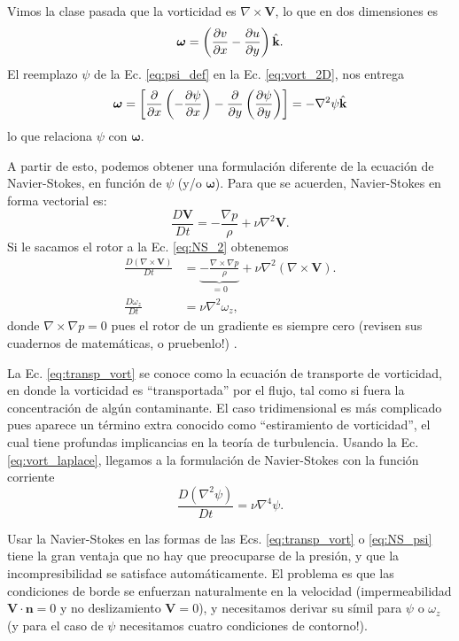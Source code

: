 Vimos la clase pasada que la vorticidad es $\nabla \times\mathbf{V}$, lo que en dos dimensiones es
%
\begin{equation}\label{eq:vort_2D}
\boldsymbol{\omega}=\left(\frac{\partial v}{\partial x}-\frac{\partial u}{\partial y} \right) \hat{\textbf{k}}.
\end{equation}
%
El reemplazo $\psi$ de la Ec. \eqref{eq:psi_def} en la Ec. \eqref{eq:vort_2D}, nos entrega
%
\begin{equation}\label{eq:vort_laplace}
\boldsymbol{\omega}=\left[\frac{\partial}{\partial x}\left(-\frac{\partial \psi}{\partial x}\right) -\frac{\partial}{\partial y}\left(\frac{\partial \psi}{\partial y}\right) \right] = -\nabla^2\psi\hat{\textbf{k}}
\end{equation}
%
lo que relaciona $\psi$ con $\boldsymbol{\omega}$.

A partir de esto, podemos obtener una formulación diferente de la ecuación de Navier-Stokes, en función de $\psi$ (y/o $\boldsymbol{\omega}$).
Para que se acuerden, Navier-Stokes en forma vectorial es:
%
\begin{equation}\label{eq:NS_2}
\frac{D\mathbf{V}}{Dt} = -\frac{\nabla p}{\rho} + \nu\nabla^2\mathbf{V}.
\end{equation}
%
Si le sacamos el rotor a la Ec. \eqref{eq:NS_2} obtenemos
%
\begin{align}\label{eq:transp_vort}
\frac{D(\nabla\times\mathbf{V})}{Dt} &= \underbrace{-\frac{\nabla\times\nabla p}{\rho}}_{=0} + \nu\nabla^2(\nabla\times\mathbf{V}). \nonumber\\
\frac{D \omega_z}{Dt} &= \nu \nabla^2 \omega_z,
\end{align}
%
donde $\nabla\times\nabla p=0$ pues el rotor de un gradiente es siempre cero (revisen sus cuadernos de matemáticas, o pruebenlo!) .

La Ec. \eqref{eq:transp_vort} se conoce como la ecuación de transporte de vorticidad, en donde la vorticidad es ``transportada'' por el flujo, tal como si fuera la concentración de algún contaminante.
El caso tridimensional es más complicado pues aparece un término extra conocido como ``estiramiento de vorticidad'', el cual tiene profundas implicancias en la teoría de turbulencia.
Usando la Ec. \eqref{eq:vort_laplace}, llegamos a la formulación de Navier-Stokes con la función corriente
%
\begin{equation}\label{eq:NS_psi}
\frac{D(\nabla^2\psi)}{Dt} = \nu\nabla^4\psi.
\end{equation}

Usar la Navier-Stokes en las formas de las Ecs. \eqref{eq:transp_vort} o \eqref{eq:NS_psi} tiene la gran ventaja que no hay que preocuparse de la presión, y que la incompresibilidad se satisface automáticamente. 
El problema es que las condiciones de borde se enfuerzan naturalmente en la velocidad (impermeabilidad $\mathbf{V}\cdot\mathbf{n}=0$ y no deslizamiento $\mathbf{V}=0$), y necesitamos derivar su símil para $\psi$ o $\omega_z$ (y para el caso de $\psi$ necesitamos cuatro condiciones de contorno!).

